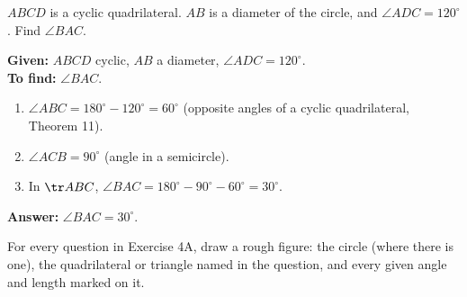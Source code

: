\begin{example}
$ABCD$ is a cyclic quadrilateral. $AB$ is a diameter of the circle, and $\angle ADC=120^\circ$. Find $\angle BAC$.
\end{example}


\textbf{Given:} $ABCD$ cyclic, $AB$ a diameter, $\angle ADC=120^\circ$.\\
\textbf{To find:} $\angle BAC$.
\begin{enumerate}[leftmargin=1.8em,itemsep=1pt]
  \item $\angle ABC=180^\circ-120^\circ=60^\circ$ (opposite angles of a cyclic quadrilateral, Theorem 11).
  \item $\angle ACB=90^\circ$ (angle in a semicircle).
  \item In $\tr ABC$, $\angle BAC=180^\circ-90^\circ-60^\circ=30^\circ$.
\end{enumerate}
\textbf{Answer:} $\angle BAC=30^\circ$.

For every question in Exercise 4A, draw a rough figure: the circle (where there is one), the quadrilateral or triangle named in the question, and every given angle and length marked on it.

